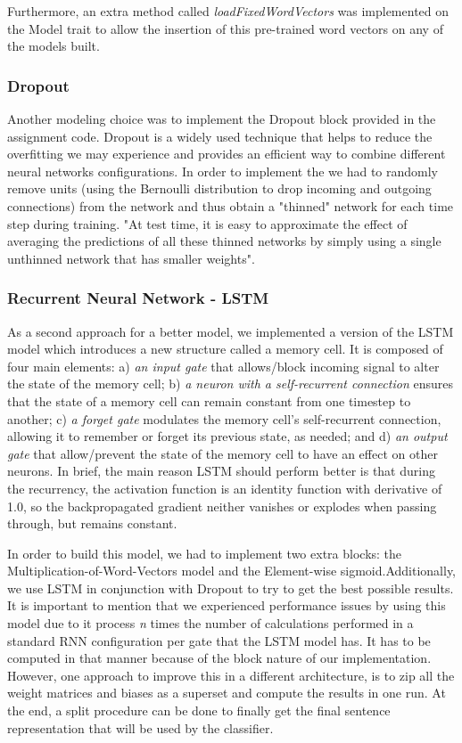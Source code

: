 \documentclass{article} %
\begin{document}
Furthermore, an extra method called \textit{loadFixedWordVectors} was implemented on the Model trait to allow the insertion of this pre-trained word vectors on any of the models built.

\subsubsection*{Dropout}

Another modeling choice was to implement the Dropout block provided in the assignment code. Dropout is a widely used technique that helps to reduce the overfitting we may experience and provides an efficient way to combine different neural networks configurations. In order to implement the we had to randomly remove units (using the Bernoulli distribution to drop incoming and outgoing connections) from the network and thus obtain a "thinned" network for each time step during training. "At test time, it is easy to approximate the effect of averaging the predictions of all these thinned networks by simply using a single unthinned network that has smaller weights".\cite{Srivastava2014}

\subsubsection*{Recurrent Neural Network - LSTM}

As a second approach for a better model, we implemented a version of the LSTM model which introduces a new structure called a memory cell. It is composed of four main elements: a) \textit{an input gate} that allows/block incoming signal to alter the state of the memory cell; b) \textit{a neuron with a self-recurrent connection} ensures that the state of a memory cell can remain constant from one timestep to another; c) \textit{a forget gate} modulates the memory cell’s self-recurrent connection, allowing it to remember or forget its previous state, as needed; and d) \textit{an output gate} that allow/prevent the state of the memory cell to have an effect on other neurons. In brief, the main reason LSTM should perform better is that during the recurrency, the activation function is an identity function with derivative of 1.0, so the backpropagated gradient neither vanishes or explodes when passing through, but remains constant.

In order to build this model, we had to implement two extra blocks: the Multiplication-of-Word-Vectors model and the Element-wise sigmoid.Additionally, we use LSTM in conjunction with Dropout to try to get the best possible results. It is important to mention that we experienced performance issues by using this model due to it process \textit{n} times the number of calculations performed in a standard RNN configuration per gate that the LSTM model has. It has to be computed in that manner because of the block nature of our implementation. However, one approach to improve this in a different architecture, is to zip all the weight matrices and biases as a superset and compute the results in one run. At the end, a split procedure can be done to finally get the final sentence representation that will be used by the classifier.
\end{document}
